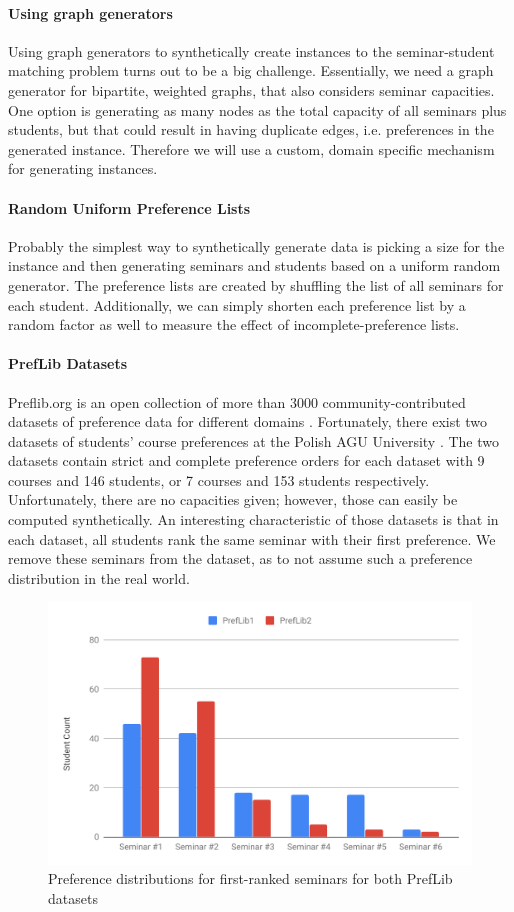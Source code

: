 \paragraph{Using graph generators}
Using graph generators to synthetically create instances to the seminar-student matching problem turns out to be a big challenge. Essentially, we need a graph generator for bipartite, weighted graphs, that also considers seminar capacities. One option is generating as many nodes as the total capacity of all seminars plus students, but that could result in having duplicate edges, i.e. preferences in the generated instance. Therefore we will use a custom, domain specific mechanism for generating instances.

\paragraph{Random Uniform Preference Lists}
Probably the simplest way to synthetically generate data is picking a size for the instance and then generating seminars and students based on a uniform random generator. The preference lists are created by shuffling the list of all seminars for each student. Additionally, we can simply shorten each preference list by a random factor as well to measure the effect of incomplete-preference lists.

\paragraph{PrefLib Datasets}
Preflib.org is an open collection of more than 3000 community-contributed datasets of preference data for different domains \cite{PrefLib}. Fortunately, there exist two datasets of students' course preferences at the Polish AGU University \cite{preflib-dataset}. The two datasets contain strict and complete preference orders for each dataset with 9 courses and 146 students, or 7 courses and 153 students respectively. Unfortunately, there are no capacities given; however, those can easily be computed synthetically. An interesting characteristic of those datasets is that in each dataset, all students rank the same seminar with their first preference. We remove these seminars from the dataset, as to not assume such a preference distribution in the real world.

\begin{figure}[h!]
    \centering
    \includegraphics[width=0.8\linewidth]{assets/plots/prelib-distr.pdf}
    \caption{Preference distributions for first-ranked seminars for both PrefLib datasets}
    \label{fig:preflib-distribution}
\end{figure}

